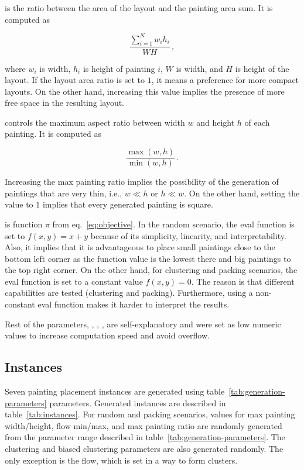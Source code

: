  is the ratio between the area of the layout and the painting area sum.
It is computed as

\[
    \dfrac{\sum\limits_{i=1}^{N} w_i h_i}{WH}\,,
\]

where $w_i$ is width, $h_i$ is height of painting $i$, $W$ is width, and $H$ is height of the layout.
If the layout area ratio is set to $1$, it means a preference for more compact layouts.
On the other hand,
increasing this value implies the presence of more free space in the resulting layout.

 controls the maximum aspect ratio between width $w$ and height $h$ of each painting.
It is computed as

\[
    \dfrac{\max(w,h)}{\min(w,h)}\,.
\]

Increasing the max painting ratio implies the possibility of the generation of paintings
that are very thin, i.e., $w \ll h$ or $h \ll w$.
On the other hand, setting the value to 1
implies that every generated painting is square.

 is function $\pi$ from eq.~\ref{eq:objective}.
In the random scenario, the eval function is set to $f(x,y) = x+y$ because of its simplicity, linearity, and interpretability.
Also, it implies that it is advantageous to place small paintings close to the bottom left corner as the function value is the lowest there and
big paintings to the top right corner.
On the other hand, for clustering and packing scenarios, the eval function is set to a constant value $f(x,y) = 0$.
The reason is that different capabilities are tested (clustering and packing).
Furthermore, using a non-constant eval function makes it harder to interpret the results.

Rest of the parameters, , , , 
are self-explanatory and were set as low numeric values to increase computation speed and avoid overflow.

\subsection{Instances}\label{subsec:instances}

Seven painting placement instances are generated using table~\ref{tab:generation-parameters} parameters.
Generated instances are described in table~\ref{tab:instances}.
For random and packing scenarios, values for max painting width/height, flow min/max, and max painting ratio are randomly generated from the parameter range described in table~\ref{tab:generation-parameters}.
The clustering and biased clustering parameters are also generated randomly.
The only exception is the flow, which is set in a way to form clusters.


